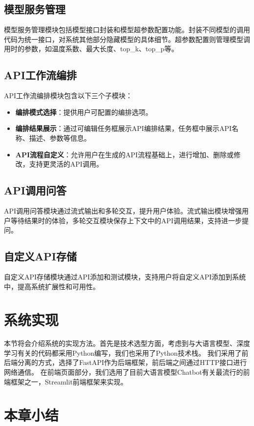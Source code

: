 \subsection{模型服务管理}
模型服务管理模块包括模型接口封装和模型超参数配置功能。封装不同模型的调用代码为统一接口，对系统其他部分隐藏模型的具体细节。超参数配置则管理模型调用时的参数，如温度系数、最大长度、top\_k、top\_p等。

\subsection{API工作流编排}
API工作流编排模块包含以下三个子模块：
\begin{itemize}
    \item \textbf{编排模式选择}：提供用户可配置的编排选项。
    \item \textbf{编排结果展示}：通过可编辑任务框展示API编排结果，任务框中展示API名称、描述、参数等信息。
    \item \textbf{API流程自定义}：允许用户在生成的API流程基础上，进行增加、删除或修改，支持更灵活的API调用。
\end{itemize}

\subsection{API调用问答}
API调用问答模块通过流式输出和多轮交互，提升用户体验。流式输出模块增强用户等待结果时的体验，多轮交互模块保存上下文中的API调用结果，支持进一步提问。

\subsection{自定义API存储}
自定义API存储模块通过API添加和测试模块，支持用户将自定义API添加到系统中，提高系统扩展性和可用性。

\section{系统实现}

本节将会介绍系统的实现方法。首先是技术选型方面，考虑到与大语言模型、深度学习有关的代码都采用Python编写，我们也采用了Python技术栈。
我们采用了前后端分离的方式，选择了FastAPI作为后端框架，前后端之间通过HTTP接口进行网络通信。
在前端页面部分，我们选用了目前大语言模型Chatbot有关最流行的前端框架之一，Streamlit前端框架来实现。



\section{本章小结}